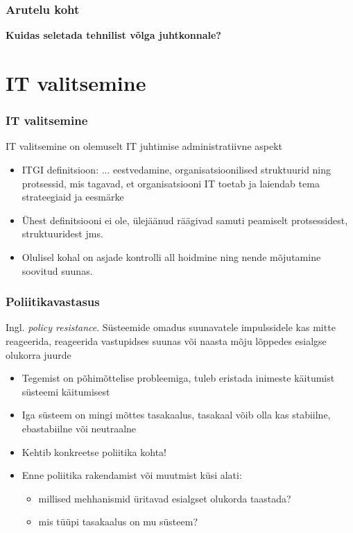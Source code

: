 \begin{frame}[fragile]
  \frametitle{Arutelu koht}
		\begin{center}
			\textbf{Kuidas seletada tehnilist võlga juhtkonnale?}
		\end{center}
\end{frame}

\section{IT valitsemine}

\begin{frame}[fragile]
  \frametitle{IT valitsemine}
  IT valitsemine on olemuselt IT juhtimise administratiivne aspekt
	\begin{itemize}
		\item ITGI definitsioon: ... eestvedamine, organisatsioonilised struktuurid ning protsessid, mis tagavad, et organisatsiooni IT toetab ja laiendab tema strateegiaid ja eesmärke \citep{insitute2003board}
		\item Ühest definitsiooni ei ole, ülejäänud räägivad samuti peamiselt protsessidest, struktuuridest jms. 
		\item Olulisel kohal on asjade kontrolli all hoidmine ning nende mõjutamine soovitud suunas. 
	\end{itemize}
\end{frame}

\begin{frame}[fragile]
  \frametitle{Poliitikavastasus}
 Ingl. \emph{policy resistance}. Süsteemide omadus suunavatele impulssidele kas mitte reageerida, reageerida vastupidses suunas või naasta mõju lõppedes esialgse olukorra juurde
	\begin{itemize}
		\item Tegemist on põhimõttelise probleemiga, tuleb eristada inimeste käitumist süsteemi käitumisest
		\item Iga süsteem on mingi mõttes tasakaalus, tasakaal võib olla kas stabiilne, ebastabiilne või neutraalne
		\item Kehtib konkreetse poliitika kohta!
		\item Enne poliitika rakendamist või muutmist küsi alati: 
		\begin{itemize}
			\item millised mehhanismid üritavad esialgset olukorda taastada? 
			\item mis tüüpi tasakaalus on mu süsteem?
	\end{itemize}

	\end{itemize}
\end{frame}

